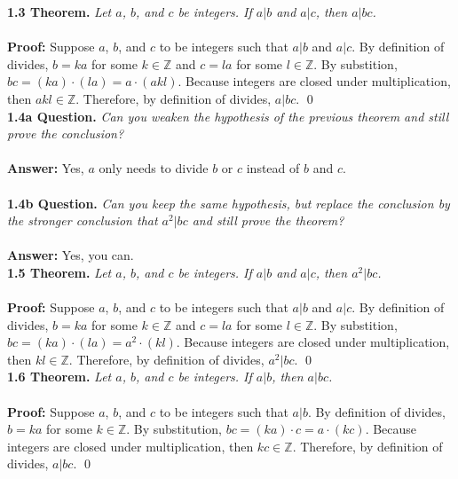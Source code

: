 \documentclass[12pt]{article}
\begin{document}
\noindent \textbf{1.3 Theorem.}
\emph{Let $a$, $b$, and $c$ be integers. If $a \vert b$ and $a \vert c$, 
then $a \vert bc$.}
~\\
~\\
\textbf{Proof:}
Suppose $a$, $b$, and $c$ to be integers such that $a \vert b$ and $a \vert c$. By definition of divides, $b = ka$ for some $k \in \mathbb{Z}$ and $c = la$ for some $l \in \mathbb{Z}$. By substition, $bc = (ka) \cdot (la) = a \cdot (akl)$. Because integers are closed under multiplication, then $akl \in \mathbb{Z}$. Therefore, by definition of divides, $a \vert bc$. \qed
~\\

\noindent \textbf{1.4a Question.} 
\emph{Can you weaken the hypothesis of the previous theorem and
still prove the conclusion? }
~\\
~\\
\textbf{Answer:} Yes, $a$ only needs to divide $b$ or $c$ instead of 
$b$ and $c$. 
~\\
~\\
\textbf{1.4b Question.}
\emph{Can you keep the same hypothesis, but replace
the conclusion by the stronger conclusion that $a^2 \vert bc$ and still prove the
theorem?}
~\\
~\\
\textbf{Answer:} Yes, you can. 
~\\

\noindent \textbf{1.5 Theorem.} 
\emph{Let $a$, $b$, and $c$ be integers. If $a \vert b$ and $a \vert c$, 
then $a^2 \vert bc$.}
~\\
~\\
\textbf{Proof:}
Suppose $a$, $b$, and $c$ to be integers such that $a \vert b$ and $a \vert c$. By definition of divides, $b = ka$ for some $k \in \mathbb{Z}$ and $c = la$ for some $l \in \mathbb{Z}$. By substition, $bc = (ka) \cdot (la) = a^2 \cdot (kl)$. Because integers are closed under multiplication, then $kl \in \mathbb{Z}$. Therefore, by definition of divides, $a^2 \vert bc$. \qed
~\\

\noindent \textbf{1.6 Theorem.} 
\emph{Let $a$, $b$, and $c$ be integers. If $a \vert b$, 
then $a \vert bc$.}
~\\
~\\
\textbf{Proof:}
Suppose $a$, $b$, and $c$ to be integers such that $a \vert b$. By definition of divides, $b = ka$ for some $k \in \mathbb{Z}$. By substitution, $bc = (ka) \cdot c = a \cdot (kc)$. Because integers are closed under multiplication, then $kc \in \mathbb{Z}$. Therefore, by definition of divides, $a \vert bc$. \qed
~\\
\end{document}

